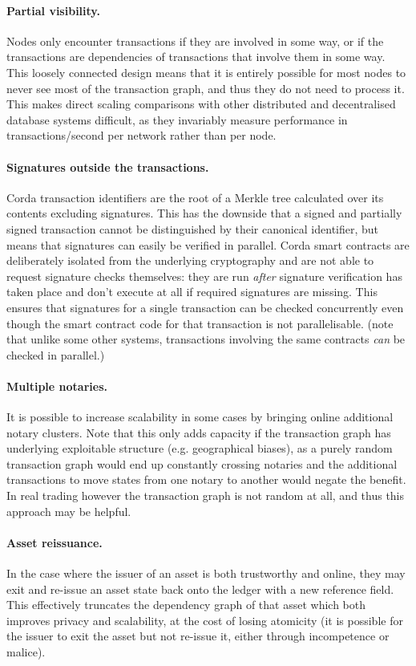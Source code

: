 \documentclass{article}
\begin{document}
\paragraph{Partial visibility.}Nodes only encounter transactions if they are involved in some way, or if the
transactions are dependencies of transactions that involve them in some way. This loosely connected design means
that it is entirely possible for most nodes to never see most of the transaction graph, and thus they do not need
to process it. This makes direct scaling comparisons with other distributed and decentralised database systems
difficult, as they invariably measure performance in transactions/second per network rather than per node.

\paragraph{Signatures outside the transactions.}Corda transaction identifiers are the root of a Merkle tree
calculated over its contents excluding signatures. This has the downside that a signed and partially signed
transaction cannot be distinguished by their canonical identifier, but means that signatures can easily be verified
in parallel. Corda smart contracts are deliberately isolated from the underlying cryptography and are not able to
request signature checks themselves: they are run \emph{after} signature verification has taken place and don't
execute at all if required signatures are missing. This ensures that signatures for a single transaction can be
checked concurrently even though the smart contract code for that transaction is not parallelisable. (note that
unlike some other systems, transactions involving the same contracts \emph{can} be checked in parallel.)

\paragraph{Multiple notaries.}It is possible to increase scalability in some cases by bringing online additional
notary clusters. Note that this only adds capacity if the transaction graph has underlying exploitable structure
(e.g. geographical biases), as a purely random transaction graph would end up constantly crossing notaries and the
additional transactions to move states from one notary to another would negate the benefit. In real trading however
the transaction graph is not random at all, and thus this approach may be helpful.

\paragraph{Asset reissuance.}In the case where the issuer of an asset is both trustworthy and online, they may exit
and re-issue an asset state back onto the ledger with a new reference field. This effectively truncates the
dependency graph of that asset which both improves privacy and scalability, at the cost of losing atomicity (it is
possible for the issuer to exit the asset but not re-issue it, either through incompetence or malice).
\end{document}
